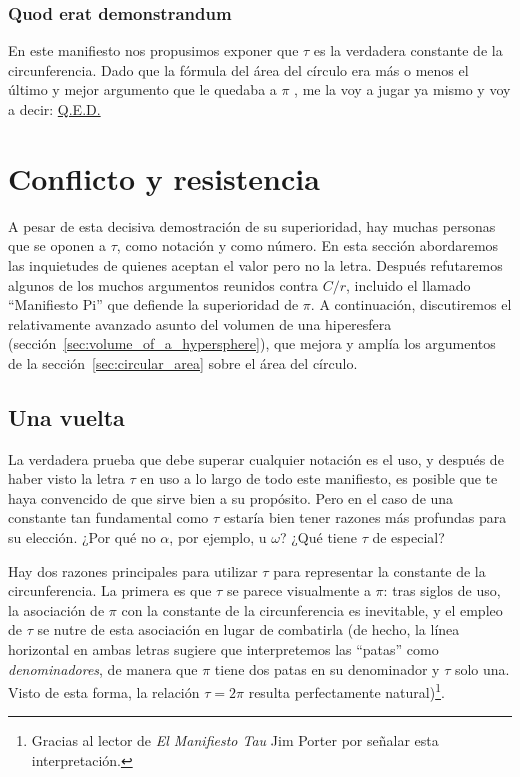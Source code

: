    \subsubsection{Quod erat demonstrandum} %
    \label{sec:quod_erat_demonstrandum}

En este manifiesto nos propusimos exponer que $\tau$ es la verdadera constante de la circunferencia. Dado que la fórmula del área del círculo era más o menos el último y mejor argumento que le quedaba a $\pi$ , me la voy a jugar ya mismo y voy a decir: \href{https://es.wikipedia.org/wiki/Quod_erat_demonstrandum}{Q.E.D.}



\section{Conflicto y resistencia} %
\label{sec:conflict_and_resistance}

A pesar de esta decisiva demostración de su superioridad, hay muchas personas que se oponen a $\tau$, como notación y como número. En esta sección abordaremos las inquietudes de quienes aceptan el valor pero no la letra. Después refutaremos algunos de los muchos argumentos reunidos contra $C/r$, incluido el llamado ``Manifiesto Pi'' que defiende la superioridad de $\pi$. A continuación, discutiremos el relativamente avanzado asunto del volumen de una hiperesfera (sección~\ref{sec:volume_of_a_hypersphere}), que mejora y amplía los argumentos de la sección~\ref{sec:circular_area} sobre el área del círculo.

  \subsection{Una vuelta} %
  \label{sec:one_turn}

La verdadera prueba que debe superar cualquier notación es el uso, y después de haber visto la letra $\tau$ en uso a lo largo de todo este manifiesto, es posible que te haya convencido de que sirve bien a su propósito. Pero en el caso de una constante tan fundamental como $\tau$ estaría bien tener razones más profundas para su elección. ¿Por qué no $\alpha$, por ejemplo, u $\omega$? ¿Qué tiene $\tau$ de especial?

Hay dos razones principales para utilizar $\tau$ para representar la constante de la circunferencia. La primera es que $\tau$ se parece visualmente a $\pi$: tras siglos de uso, la asociación de $\pi$ con la constante de la circunferencia es inevitable, y el empleo de $\tau$ se nutre de esta asociación en lugar de combatirla (de hecho, la línea horizontal en ambas letras sugiere que interpretemos las ``patas'' como \emph{denominadores}, de manera que $\pi$ tiene dos patas en su denominador y $\tau$ solo una. Visto de esta forma, la relación $\tau = 2\pi$ resulta perfectamente natural)\footnote{Gracias al lector de \emph{El Manifiesto Tau} Jim Porter por señalar esta interpretación.}.

